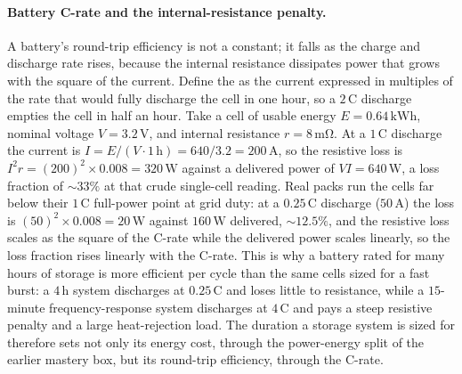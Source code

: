 \paragraph{Battery C-rate and the internal-resistance penalty.} A battery's
round-trip efficiency is not a constant; it falls as the charge and discharge
rate rises, because the internal resistance dissipates power that grows with
the square of the current. Define the  as the current
expressed in multiples of the rate that would fully discharge the cell in one
hour, so a $2\,\text{C}$ discharge empties the cell in half an hour. Take a
cell of usable energy $E = 0.64\,\si{\kilo\watt\hour}$, nominal voltage
$V = 3.2\,\si{\volt}$, and internal resistance $r = 8\,\si{\milli\ohm}$. At a
$1\,\text{C}$ discharge the current is $I = E/(V\cdot 1\,\si{\hour}) =
640/3.2 = 200\,\si{\ampere}$, so the resistive loss is $I^2 r = (200)^2\times
0.008 = 320\,\si{\watt}$ against a delivered power of $V I = 640\,\si{\watt}$,
a loss fraction of $\sim 33\%$ at that crude single-cell reading. Real packs
run the cells far below their $1\,\text{C}$ full-power point at grid duty: at
a $0.25\,\text{C}$ discharge ($50\,\si{\ampere}$) the loss is $(50)^2\times
0.008 = 20\,\si{\watt}$ against $160\,\si{\watt}$ delivered, $\sim 12.5\%$,
and the resistive loss scales as the square of the C-rate while the delivered
power scales linearly, so the loss fraction rises linearly with the C-rate.
This is why a battery rated for many hours of storage is more efficient per
cycle than the same cells sized for a fast burst: a $4\,\si{\hour}$ system
discharges at $0.25\,\text{C}$ and loses little to resistance, while a
$15$-minute frequency-response system discharges at $4\,\text{C}$ and pays a
steep resistive penalty and a large heat-rejection load. The duration a
storage system is sized for therefore sets not only its energy cost, through
the power-energy split of the earlier mastery box, but its round-trip
efficiency, through the C-rate.

